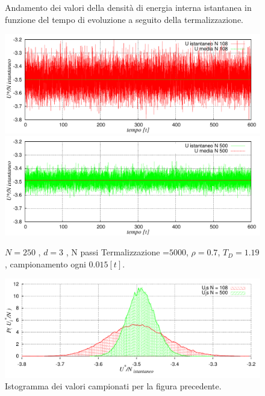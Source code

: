 \documentclass[11pt]{article}
\theoremstyle{plain}
\theoremstyle{remark}
\begin{document}
	\begin{figure}
		\centering
		\caption[Sfere Soffici$/$Problema9.cpp]{Andamento dei valori della densità di energia interna istantanea in funzione del tempo di evoluzione a seguito della termalizzazione.}\label{fig: Problema9}

		\includegraphics[scale=0.5]{Immagini/Soffici/UvsStepN108}

		\includegraphics[scale=0.5]{Immagini/Soffici/UvsStepN500}

		\centering  \footnotesize{$N= 250$ , $d=3$ , N passi Termalizzazione =$ 5000$, $\rho = 0.7$,	$T_D=1.19$, campionamento ogni $0.015 [t]$.}

		\caption[Sfere Soffici$/$Problema9.cpp]{Istogramma dei valori campionati per la figura precedente.}\label{fig: Isto_Problema9}

		\includegraphics[scale=0.5]{Immagini/Soffici/IstoU}

	\end{figure}
	
\end{document}
